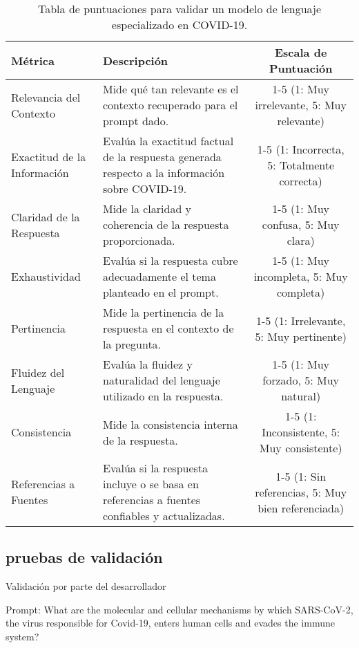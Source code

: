 \begin{table}[h]
    \centering
   \hspace*{-2.5cm}\begin{tabular}{|l|p{3cm}|c|}
        \hline
        \textbf{Métrica} & \textbf{Descripción} & \textbf{Escala de Puntuación} \\
        \hline
        Relevancia del Contexto & Mide qué tan relevante es el contexto recuperado para el prompt dado. & 1-5 (1: Muy irrelevante, 5: Muy relevante) \\
        \hline
        Exactitud de la Información & Evalúa la exactitud factual de la respuesta generada respecto a la información sobre COVID-19. & 1-5 (1: Incorrecta, 5: Totalmente correcta) \\
        \hline
        Claridad de la Respuesta & Mide la claridad y coherencia de la respuesta proporcionada. & 1-5 (1: Muy confusa, 5: Muy clara) \\
        \hline
        Exhaustividad & Evalúa si la respuesta cubre adecuadamente el tema planteado en el prompt. & 1-5 (1: Muy incompleta, 5: Muy completa) \\
        \hline
        Pertinencia & Mide la pertinencia de la respuesta en el contexto de la pregunta. & 1-5 (1: Irrelevante, 5: Muy pertinente) \\
        \hline
        Fluidez del Lenguaje & Evalúa la fluidez y naturalidad del lenguaje utilizado en la respuesta. & 1-5 (1: Muy forzado, 5: Muy natural) \\
        \hline
        Consistencia & Mide la consistencia interna de la respuesta. & 1-5 (1: Inconsistente, 5: Muy consistente) \\
        \hline
        Referencias a Fuentes & Evalúa si la respuesta incluye o se basa en referencias a fuentes confiables y actualizadas. & 1-5 (1: Sin referencias, 5: Muy bien referenciada) \\
        \hline
    \end{tabular}
    \caption{Tabla de puntuaciones para validar un modelo de lenguaje especializado en COVID-19.}
    \label{tab:validation_scores}
\end{table}

\subsection{pruebas de validación}

Validación por parte del desarrollador

Prompt: What are the molecular and cellular mechanisms by which SARS-CoV-2, the virus responsible for Covid-19, enters human cells and evades the immune system?

